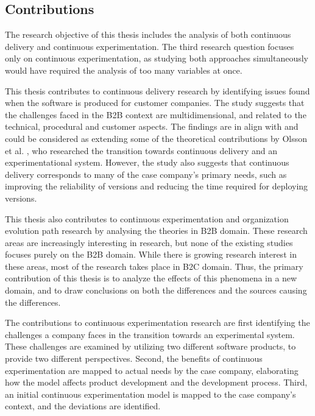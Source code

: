\documentclass[english]{tktltiki2}
\theoremstyle{definition}
\theoremstyle{remark}
\begin{document}
\subsection{Contributions}
The research objective of this thesis includes the analysis of both continuous delivery and continuous experimentation. The third research question focuses only on continuous experimentation, as studying both approaches simultaneously would have required the analysis of too many variables at once. 

This thesis contributes to continuous delivery research by identifying issues found when the software is produced for customer companies. The study suggests that the challenges faced in the B2B context are multidimensional, and related to the technical, procedural and customer aspects. The findings are in align with and could be considered as extending some of the theoretical contributions by Olsson et al. \cite{olsson2012climbing}, who researched the transition towards continuous delivery and an experimentational system. However, the study also suggests that continuous delivery corresponds to many of the case company's primary needs, such as improving the reliability of versions and reducing the time required for deploying versions.

This thesis also contributes to continuous experimentation \cite{fagerholm2014building, eklund2012architecture, bosch2012building} and organization evolution path \cite{olsson2012climbing} research by analysing the theories in B2B domain. These research areas are increasingly interesting in research, but none of the existing studies focuses purely on the B2B domain. While there is growing research interest in these areas, most of the research takes place in B2C domain. Thus, the primary contribution of this thesis is to analyze the effects of this phenomena in a new domain, and to draw conclusions on both the differences and the sources causing the differences.

The contributions to continuous experimentation research are first identifying the challenges a company faces in the transition towards an experimental system. These challenges are examined by utilizing two different software products, to provide two different perspectives. Second, the benefits of continuous experimentation are mapped to actual needs by the case company, elaborating how the model affects product development and the development process. Third, an initial continuous experimentation model \cite{fagerholm2014building} is mapped to the case company's context, and the deviations are identified.
\end{document}
